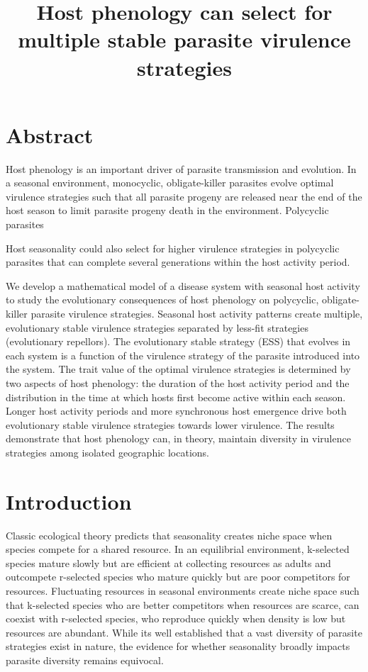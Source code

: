 \documentclass{article}
\title{Host phenology can select for multiple stable parasite virulence strategies}
\date{}
\begin{document}
\maketitle

\section*{Abstract}
Host phenology is an important driver of parasite transmission and evolution. In a seasonal environment, monocyclic, obligate-killer parasites evolve optimal virulence strategies such that all parasite progeny are released near the end of the host season to limit parasite progeny death in the environment. Polycyclic parasites 

Host seasonality could also select for higher virulence strategies in polycyclic parasites that can complete several generations within the host activity period. 

We develop a mathematical model of a disease system with seasonal host activity to study the evolutionary consequences of host phenology on polycyclic, obligate-killer parasite virulence strategies. Seasonal host activity patterns create multiple, evolutionary stable virulence strategies separated by less-fit strategies (evolutionary repellors). The evolutionary stable strategy (ESS) that evolves in each system is a function of the virulence strategy of the parasite introduced into the system. The trait value of the optimal virulence strategies is determined by two aspects of host phenology: the duration of the host activity period and the distribution in the time at which hosts first become active within each season. Longer host activity periods and more synchronous host emergence drive both evolutionary stable virulence strategies towards lower virulence. The results demonstrate that host phenology can, in theory, maintain diversity in virulence strategies among isolated geographic locations.




\section*{Introduction}
Classic ecological theory predicts that seasonality creates niche space when species compete for a shared resource. In an equilibrial environment, k-selected species mature slowly but are efficient at collecting resources as adults and outcompete r-selected species who mature quickly but are poor competitors for resources\cite{tilman2020resource}. Fluctuating resources in seasonal environments create niche space such that k-selected species who are better competitors when resources are scarce, can coexist with r-selected species, who reproduce quickly when density is low but resources are abundant\cite{koch1974competitive,armstrong1980competitive,litchman2001competition,klausmeier2008floquet}. While its well established that a vast diversity of parasite strategies exist in nature, the evidence for whether seasonality broadly impacts parasite diversity remains equivocal.
\end{document}
